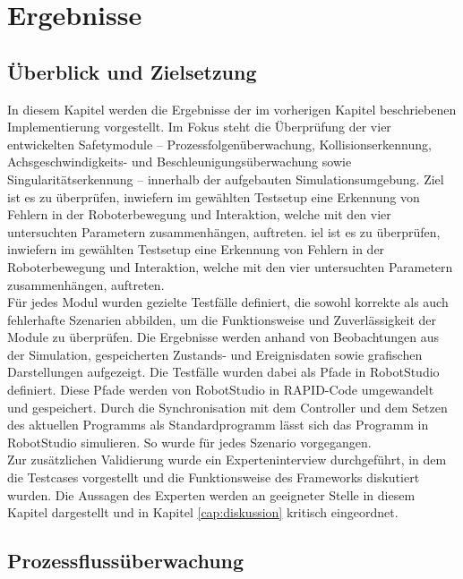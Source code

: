 \chapter{Ergebnisse}
\label{cap:Ergebnisse}

\section{Überblick und Zielsetzung}

In diesem Kapitel werden die Ergebnisse der im vorherigen Kapitel beschriebenen
Implementierung vorgestellt. Im Fokus steht die Überprüfung der vier
entwickelten Safetymodule – Prozessfolgenüberwachung, Kollisionserkennung,
Achsgeschwindigkeits- und Beschleunigungsüberwachung sowie
Singularitätserkennung – innerhalb der aufgebauten Simulationsumgebung. Ziel ist
es zu überprüfen, inwiefern im gewählten Testsetup eine Erkennung von Fehlern in
der Roboterbewegung und Interaktion, welche mit den vier untersuchten Parametern
zusammenhängen, auftreten. iel ist es zu überprüfen, inwiefern im gewählten
Testsetup eine Erkennung von Fehlern in der Roboterbewegung und Interaktion,
welche mit den vier untersuchten Parametern zusammenhängen, auftreten.\\

\noindent
Für jedes Modul wurden gezielte Testfälle definiert, die sowohl korrekte als
auch fehlerhafte Szenarien abbilden, um die Funktionsweise und Zuverlässigkeit
der Module zu überprüfen. Die Ergebnisse werden anhand von Beobachtungen aus der
Simulation, gespeicherten Zustands- und Ereignisdaten sowie grafischen
Darstellungen aufgezeigt. Die Testfälle wurden dabei als Pfade in RobotStudio
definiert. Diese Pfade werden von RobotStudio in RAPID-Code umgewandelt und
gespeichert. Durch die Synchronisation mit dem Controller und dem Setzen des
aktuellen Programms als Standardprogramm lässt sich das Programm in RobotStudio
simulieren. So wurde für jedes Szenario vorgegangen.\\

\noindent
Zur zusätzlichen Validierung wurde ein Experteninterview durchgeführt, in dem
die Testcases vorgestellt und die Funktionsweise des Frameworks diskutiert
wurden. Die Aussagen des Experten werden an geeigneter Stelle in diesem Kapitel
dargestellt und in Kapitel \ref{cap:diskussion} kritisch eingeordnet.
\newpage
\section{Prozessflussüberwachung}
\label{sec:processauswertung}

